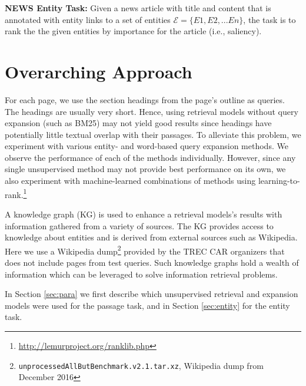 \documentclass{article}
\begin{document}
\noindent \textbf{NEWS Entity Task:} Given a news article with title and content that is annotated with entity links to a set of entities  $\mathcal{E}=\{E1, E2, ... En\}$, the task is to rank the the given entities by importance for the article (i.e., saliency). 

\medskip 

\section{Overarching Approach}
\label{sec:overarching}
 For each page, we use the section headings from the page's outline as queries. The headings are usually very short. Hence, using retrieval models without query expansion (such as BM25) may not yield good results since headings have potentially little textual overlap with their passages. To alleviate this problem, we experiment with various entity- and word-based query expansion methods. We observe the performance of each of the methods individually. However, since any single unsupervised method may not provide best performance on its own, we also experiment with machine-learned combinations of methods using learning-to-rank.\footnote{\url{http://lemurproject.org/ranklib.php}} 

A knowledge graph (KG) is used to enhance a retrieval models's results with information gathered from a variety of sources. The KG provides access to knowledge about entities and is derived from external sources such as Wikipedia. Here we use a Wikipedia dump\footnote{\texttt{unprocessedAllButBenchmark.v2.1.tar.xz}, Wikipedia dump from December 2016} provided by the TREC CAR organizers that does not include pages from test queries. Such knowledge graphs hold a wealth of information which can be leveraged to solve information retrieval problems. 

In Section \ref{sec:para} we first describe which unsupervised retrieval and expansion models were used for the passage task, and in Section \ref{sec:entity} for the entity task.  

\end{document}
